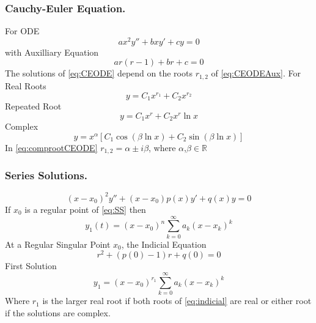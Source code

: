 \documentclass[../../main.tex]{subfiles}
\begin{document}
\subsubsection*{Cauchy-Euler Equation.} For ODE
\begin{equation}
ax^2y''+bxy'+cy=0 \label{eq:CEODE}
\end{equation}
with Auxilliary Equation
\begin{equation}
ar(r-1)+br+c=0\label{eq:CEODEAux}
\end{equation}
The solutions of \eqref{eq:CEODE} depend on the roots $r_{1,2}$ of \eqref{eq:CEODEAux}. For Real Roots
\begin{equation*}
y = C_1x^{r_1} + C_2x^{r_2}
\end{equation*}
Repeated Root
\begin{equation*}
y = C_1 x^r + C_2 x^r \ln x
\end{equation*}
Complex
\begin{equation}
y=x^{\alpha}[C_1\cos(\beta \ln x) + C_2 \sin (\beta \ln x)] \label{eq:comprootCEODE}
\end{equation}
In \eqref{eq:comprootCEODE} $r_{1,2}=\alpha\pm i\beta$, where $\alpha$,$\beta\in\mathds{R}$

\subsubsection*{Series Solutions.} 
\begin{equation}
(x-x_0)^2y''+(x-x_0)p(x)y'+q(x)y=0 \label{eq:SS}
\end{equation}
If $x_0$ is a regular point of \eqref{eq:SS} then 
\begin{equation*}
y_1(t) = (x-x_0)^n\sum_{k=0}^{\infty}a_k(x-x_k)^k
\end{equation*}
At a Regular Singular Point $x_0$, the Indicial Equation
\begin{equation}
r^2+(p(0)-1)r + q(0)=0 \label{eq:indicial}
\end{equation}
First Solution
\begin{equation*}
y_1=(x-x_0)^{r_1}\sum_{k=0}^{\infty}a_k(x-x_k)^k
\end{equation*}
Where $r_1$ is the larger real root if both roots of \eqref{eq:indicial} are real or either root if the solutions are complex. 
\end{document}
